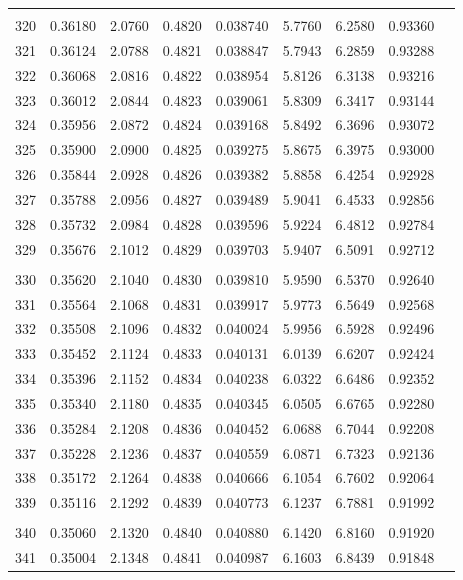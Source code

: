 \documentclass[letter,twosides,10pt]{article}
\begin{document}
\begin{longtable}{|c|c|c|c|c|c|c|c|c|}
 & & & & & & & \\
320 & 0.36180 & 2.0760 & 0.4820 & 0.038740 & 5.7760 &  6.2580 & 0.93360 \\
321 & 0.36124 & 2.0788 & 0.4821 & 0.038847 & 5.7943 &  6.2859 & 0.93288 \\
322 & 0.36068 & 2.0816 & 0.4822 & 0.038954 & 5.8126 &  6.3138 & 0.93216 \\
323 & 0.36012 & 2.0844 & 0.4823 & 0.039061 & 5.8309 &  6.3417 & 0.93144 \\
324 & 0.35956 & 2.0872 & 0.4824 & 0.039168 & 5.8492 &  6.3696 & 0.93072 \\
325 & 0.35900 & 2.0900 & 0.4825 & 0.039275 & 5.8675 &  6.3975 & 0.93000 \\
326 & 0.35844 & 2.0928 & 0.4826 & 0.039382 & 5.8858 &  6.4254 & 0.92928 \\
327 & 0.35788 & 2.0956 & 0.4827 & 0.039489 & 5.9041 &  6.4533 & 0.92856 \\
328 & 0.35732 & 2.0984 & 0.4828 & 0.039596 & 5.9224 &  6.4812 & 0.92784 \\
329 & 0.35676 & 2.1012 & 0.4829 & 0.039703 & 5.9407 &  6.5091 & 0.92712 \\
 & & & & & & & \\
330 & 0.35620 & 2.1040 & 0.4830 & 0.039810 & 5.9590 &  6.5370 & 0.92640 \\
331 & 0.35564 & 2.1068 & 0.4831 & 0.039917 & 5.9773 &  6.5649 & 0.92568 \\
332 & 0.35508 & 2.1096 & 0.4832 & 0.040024 & 5.9956 &  6.5928 & 0.92496 \\
333 & 0.35452 & 2.1124 & 0.4833 & 0.040131 & 6.0139 &  6.6207 & 0.92424 \\
334 & 0.35396 & 2.1152 & 0.4834 & 0.040238 & 6.0322 &  6.6486 & 0.92352 \\
335 & 0.35340 & 2.1180 & 0.4835 & 0.040345 & 6.0505 &  6.6765 & 0.92280 \\
336 & 0.35284 & 2.1208 & 0.4836 & 0.040452 & 6.0688 &  6.7044 & 0.92208 \\
337 & 0.35228 & 2.1236 & 0.4837 & 0.040559 & 6.0871 &  6.7323 & 0.92136 \\
338 & 0.35172 & 2.1264 & 0.4838 & 0.040666 & 6.1054 &  6.7602 & 0.92064 \\
339 & 0.35116 & 2.1292 & 0.4839 & 0.040773 & 6.1237 &  6.7881 & 0.91992 \\
 & & & & & & & \\
340 & 0.35060 & 2.1320 & 0.4840 & 0.040880 & 6.1420 &  6.8160 & 0.91920 \\
341 & 0.35004 & 2.1348 & 0.4841 & 0.040987 & 6.1603 &  6.8439 & 0.91848 \\

\end{longtable}
\end{document}
